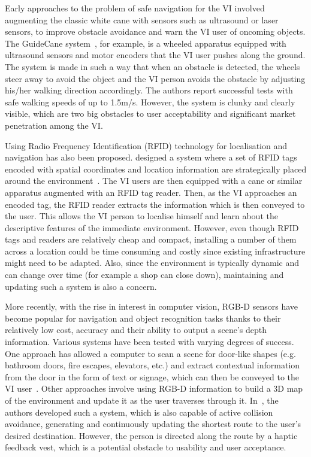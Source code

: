\documentclass[format=sigconf, review=true, screen=true, anonymous=true]{acmart}
\begin{document}
Early approaches to the problem of safe navigation for the VI involved augmenting the classic white cane with sensors such as ultrasound or laser sensors, to improve obstacle avoidance and warn the VI user of oncoming objects. The GuideCane system~\cite{ulrich1997}, for example, is a wheeled apparatus equipped with ultrasound sensors and motor encoders that the VI user pushes along the ground. The system is made in such a way that when an obstacle is detected, the wheels steer away to avoid the object and the VI person avoids the obstacle by adjusting his/her walking direction accordingly. The authors report successful tests with safe walking speeds of up to 1.5m/s. However, the system is clunky and clearly visible, which are two big obstacles to user acceptability and significant market penetration among the VI.

Using Radio Frequency Identification (RFID) technology for localisation and navigation has also been proposed. \citeauthor{willis2005} designed a system where a set of RFID tags encoded with spatial coordinates and location information are strategically placed around the environment~\cite{willis2005}. The VI users are then equipped with a cane or similar apparatus augmented with an RFID tag reader. Then, as the VI approaches an encoded tag, the RFID reader extracts the information which is then conveyed to the user. This allows the VI person to localise himself and learn about the descriptive features of the immediate environment. However, even though RFID tags and readers are relatively cheap and compact, installing a number of them across a location could be time consuming and costly since existing infrastructure might need to be adapted. Also, since the environment is typically dynamic and can change over time (for example a shop can close down), maintaining and updating such a system is also a concern.

More recently, with the rise in interest in computer vision, RGB-D sensors have become popular for navigation and object recognition tasks thanks to their relatively low cost, accuracy and their ability to output a scene's depth information. Various systems have been tested with varying degrees of success. One approach has allowed a computer to scan a scene for door-like shapes (e.g. bathroom doors, fire escapes, elevators, etc.) and extract contextual information from the door in the form of text or signage, which can then be conveyed to the VI user~\cite{tian2013b}. Other approaches involve using RGB-D information to build a 3D map of the environment and update it as the user traverses through it. In~\citeauthor{lee2015}, \citeyear{lee2015} the authors developed such a system, which is also capable of active collision avoidance, generating and continuously updating the shortest route to the user's desired destination. However, the person is directed along the route by a haptic feedback vest, which is a potential obstacle to usability and user acceptance.
\end{document}
